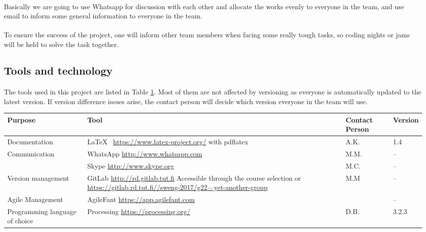 \paragraph{} Basically we are going to use Whatsapp for discussion with each other and allocate the works evenly to everyone in the team, and use email to inform some general information to everyone in the team.

\paragraph{} To ensure the success of the project, one will inform other team members when facing some really tough tasks, so coding nights or jams will be held to solve the task together.

\subsection{Tools and technology}

\paragraph{} The tools used in this project are listed in Table \ref{table:tools}. Most of them are not affected by versioning as everyone is automatically updated to the latest version. If version difference issues arise, the contact person will decide which version everyone in the team will use.

\begin{table}[h]
\scriptsize
{}
\label{table:tools}
\begin{tabularx}{\textwidth}{|l|X|l|l|}
\hline
\rowcolor{Gray} \textbf{Purpose} & \textbf{Tool} & \textbf{Contact Person} & \textbf{Version} \\
\hline
Documentation & \LaTeX~ \href{https://www.latex-project.org/}{https://www.latex-project.org/} with pdflatex & A.K. & 1.4 \\
\hline
\multirow{2}{*}{Communication } & WhatsApp \href{http://www.whatsapp.com}{http://www.whatsapp.com} & M.M. & – \\
                                \cline{2-4}
                                & Skype \href{http://www.skype.org}{http://www.skype.org} & M.C. & – \\
\hline
Version management & GitLab \href{http://rd.gitlab.tut.fi}{http://rd.gitlab.tut.fi} \newline Accessible through the course selection or \href{https://gitlab.rd.tut.fi//sweng-2017/g22---yet-another-group}{https://gitlab.rd.tut.fi//sweng-2017/g22---yet-another-group} & M.M & – \\
\hline
Agile Management & AgileFant \href{https://app.agilefant.com}{https://app.agilefant.com} & & – \\
\hline
Programming language of choice & Processing \href{https://processing.org/}{https://processing.org/} & D.B. & 3.2.3 \\
\hline
\end{tabularx}
\end{table}
